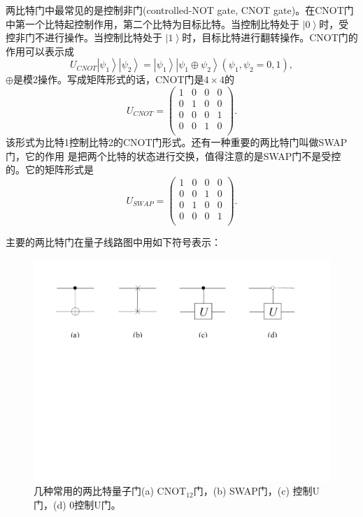两比特门中最常见的是控制非门(controlled-NOT gate, CNOT gate)。在CNOT门中第一个比特起控制作用，第二个比特为目标比特。当控制比特处于 $\left\vert 0\right\rangle$时，受控非门不进行操作。当控制比特处于 $\left\vert 1\right\rangle$时，目标比特进行翻转操作。CNOT门的作用可以表示成
 \begin{equation}
    U_{CNOT} \left\vert \psi_1\right\rangle \left\vert \psi_2\right\rangle = \left\vert \psi_1\right\rangle \left\vert \psi_1\oplus \psi_2\right\rangle (\psi_1,\psi_2 = 0,1),
\end{equation}
$\oplus$是模2操作。写成矩阵形式的话，CNOT门是$4\times4$的
 \begin{equation}
    U_{CNOT} = \left(
                 \begin{array}{cccc}
                   1 & 0 & 0 & 0 \\
                   0 & 1 & 0 & 0 \\
                   0 & 0 & 0 & 1 \\
                   0 & 0 & 1 & 0 \\
                 \end{array}
               \right).
\end{equation}
该形式为比特1控制比特2的CNOT门形式。还有一种重要的两比特门叫做SWAP门，它的作用
是把两个比特的状态进行交换，值得注意的是SWAP门不是受控的。它的矩阵形式是
 \begin{equation}
    U_{SWAP} = \left(
                 \begin{array}{cccc}
                   1 & 0 & 0 & 0 \\
                   0 & 0 & 1 & 0 \\
                   0 & 1 & 0 & 0 \\
                   0 & 0 & 0 & 1 \\
                 \end{array}
               \right).
\end{equation}

主要的两比特门在量子线路图中用如下符号表示：
\begin{figure}[htbp]
            \begin{center}
              \includegraphics[width= 0.8\columnwidth]{figures/cnot.pdf}
              \caption{几种常用的两比特量子门(a) CNOT$_{12}$门，(b) SWAP门，(c) 控制U门，(d) 0控制U门。
              }
              \label{cnot}
            \end{center}
  \end{figure}

